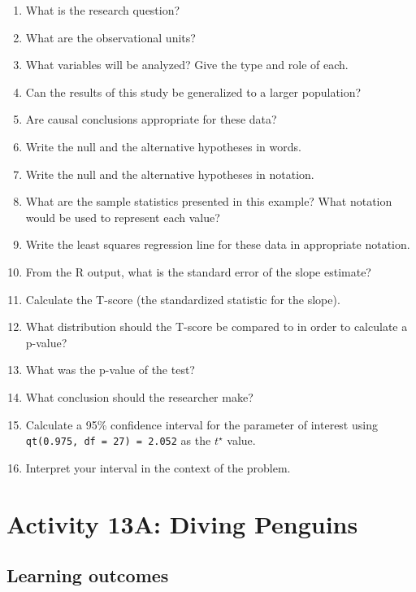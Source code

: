 \documentclass[
]{report}
\newcommand{\rgs}{\vspace{12pt}} %
\begin{document}
\begin{enumerate}
\def\labelenumi{\arabic{enumi}.}
\item
  What is the research question?
  \rgs
\item
  What are the observational units?
  \rgs
\item
  What variables will be analyzed? Give the type and role of each.
  \rgs
  \rgs
\item
  Can the results of this study be generalized to a larger population?
  \rgs
\item
  Are causal conclusions appropriate for these data?
  \rgs
\item
  Write the null and the alternative hypotheses in words.
  \rgs
  \rgs
\item
  Write the null and the alternative hypotheses in notation.
  \rgs
\item
  What are the sample statistics presented in this example? What notation would be used to represent each value?
  \rgs
\item
  Write the least squares regression line for these data in appropriate notation.
  \rgs
\item
  From the R output, what is the standard error of the slope estimate?
  \rgs
\item
  Calculate the T-score (the standardized statistic for the slope).
  \rgs
  \rgs
\item
  What distribution should the T-score be compared to in order to calculate a p-value?
  \rgs
\item
  What was the p-value of the test?
  \rgs
\item
  What conclusion should the researcher make?
  \rgs
  \rgs
\item
  Calculate a 95\% confidence interval for the parameter of interest using \texttt{qt(0.975,\ df\ =\ 27)\ =\ 2.052} as the \(t^\star\) value.
  \rgs
  \rgs
\item
  Interpret your interval in the context of the problem.
  \rgs
  \rgs
\end{enumerate}

\newpage

\hypertarget{activity-13a-diving-penguins}{%
\section{Activity 13A: Diving Penguins}\label{activity-13a-diving-penguins}}


\hypertarget{learning-outcomes-25}{%
\subsection{Learning outcomes}\label{learning-outcomes-25}}
\end{document}
